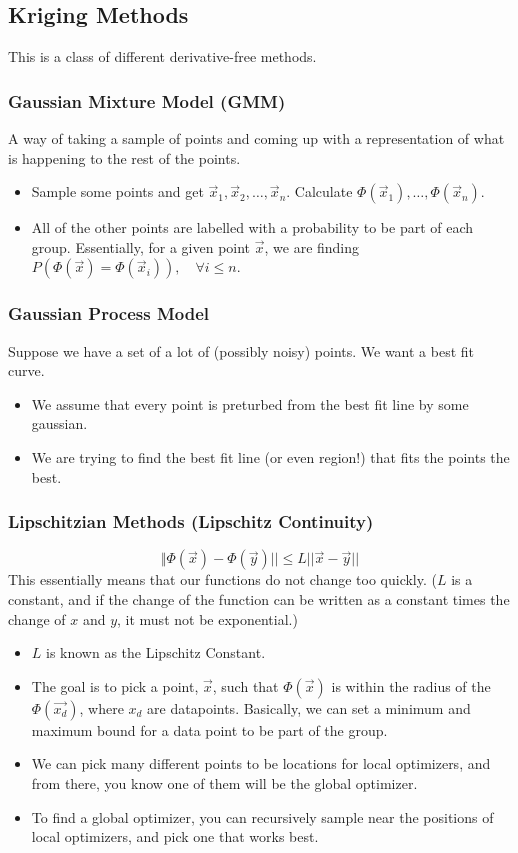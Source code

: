 \documentclass[10pt]{article}
\begin{document}
\subsection*{Kriging Methods}
This is a class of different derivative-free methods.

\subsubsection*{Gaussian Mixture Model (GMM)}
A way of taking a sample of points and coming up with a representation of what is happening to the rest of the points.
\begin{itemize}
	\item Sample some points and get $\vec{x}_1, \vec{x}_2, \dots, \vec{x}_n$.  Calculate $\Phi(\vec{x}_1), \dots, \Phi(\vec{x}_n)$.
	\item All of the other points are labelled with a probability to be part of each group.  Essentially, for a given point $\vec{x}$, we are finding $P(\Phi(\vec{x}) = \Phi(\vec{x}_i)), \quad \forall i \leq n$.
\end{itemize}

\subsubsection*{Gaussian Process Model}
Suppose we have a set of a lot of (possibly noisy) points.  We want a best fit curve.
\begin{itemize}
	\item We assume that every point is preturbed from the best fit line by some gaussian.
	\item We are trying to find the best fit line (or even region!) that fits the points the best.
\end{itemize}

\subsubsection*{Lipschitzian Methods (Lipschitz Continuity)}
\[\Vert \Phi(\vec{x}) - \Phi(\vec{y})|| \leq L||\vec{x} - \vec{y}||\]
This essentially means that our functions do not change too quickly.  ($L$ is a constant, and if the change of the function can be written as a constant times the change of $x$ and $y$, it must not be exponential.)
\begin{itemize}
	\item $L$ is known as the Lipschitz Constant.
	\item The goal is to pick a point, $\vec{x}$, such that $\Phi(\vec{x})$ is within the radius of the $\Phi(\vec{x_d})$, where $x_d$ are datapoints.  Basically, we can set a minimum and maximum bound for a data point to be part of the group.
	\item We can pick many different points to be locations for local optimizers, and from there, you know one of them will be the global optimizer. 
	\item To find a global optimizer, you can recursively sample near the positions of local optimizers, and pick one that works best.
\end{itemize}
\end{document}
